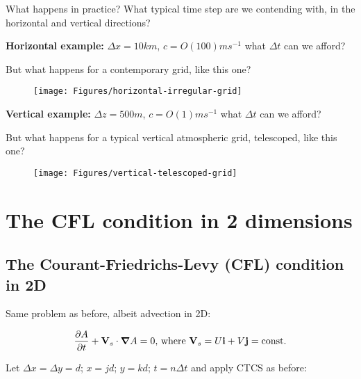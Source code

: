 What happens in practice? What typical time step are we contending with, in the horizontal and vertical directions?

\medskip

	{\bf Horizontal example:} $\Delta x = 10km$, $c = O(100) ms^{-1}$ what $\Delta t$ can we afford?
	
	\medskip
	
	But what happens for a contemporary grid, like this one?	
	\begin{figure}
		\texttt{[image: Figures/horizontal-irregular-grid]}
	\end{figure}

\hfill


{\bf Vertical example:} $\Delta z = 500m$, $c = O(1) ms^{-1}$ what $\Delta t$ can we afford?

	\medskip

But what happens for a typical vertical atmospheric grid, telescoped, like this one?
	\begin{figure}
	\texttt{[image: Figures/vertical-telescoped-grid]}
\end{figure}


\section{The CFL condition in 2 dimensions}

\subsection{The Courant-Friedrichs-Levy (CFL) condition in 2D}

	Same problem as before, albeit advection in 2D:
	
	\begin{equation}
		\frac{\partial A}{\partial t} + \mathbf{V}_s \cdot \mbox{\boldmath $\nabla$}{A} = 0 \textrm{, where } \mathbf{V}_s=U\mathbf{i}+V\mathbf{j} = \textrm{const.}
	\end{equation}
	
	Let $\Delta x = \Delta y =d$; $x=jd$; $y=kd$; $t=n \Delta t$ and apply CTCS as before:
	

